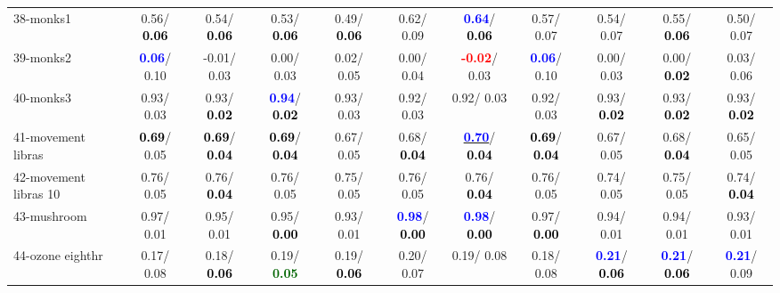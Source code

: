 \begin{table}[h]
\begin{center}
{\begin{tabular}{lc|c|c|c|c|c|c|c|c|c}
38-monks1 &   0.56/\textcolor{black}{\textbf{  0.06}} &   0.54/\textcolor{black}{\textbf{  0.06}} &   0.53/\textcolor{black}{\textbf{  0.06}} &   0.49/\textcolor{black}{\textbf{  0.06}} &   0.62/  0.09 & \textcolor{blue}{\textbf{  0.64}}/\textcolor{black}{\textbf{  0.06}} &   0.57/  0.07 &   0.54/  0.07 &   0.55/\textcolor{black}{\textbf{  0.06}} &   0.50/  0.07 \\
39-monks2 & \textcolor{blue}{\textbf{  0.06}}/  0.10 &  -0.01/  0.03 &   0.00/  0.03 &   0.02/  0.05 &   0.00/  0.04 & \textcolor{red}{\textbf{ -0.02}}/  0.03 & \textcolor{blue}{\textbf{  0.06}}/  0.10 &   0.00/  0.03 &   0.00/\textcolor{black}{\textbf{  0.02}} &   0.03/  0.06 \\ \hline
40-monks3 &   0.93/  0.03 &   0.93/\textcolor{black}{\textbf{  0.02}} & \textcolor{blue}{\textbf{  0.94}}/\textcolor{black}{\textbf{  0.02}} &   0.93/  0.03 &   0.92/  0.03 &   0.92/  0.03 &   0.92/  0.03 &   0.93/\textcolor{black}{\textbf{  0.02}} &   0.93/\textcolor{black}{\textbf{  0.02}} &   0.93/\textcolor{black}{\textbf{  0.02}} \\
41-movement libras & \textcolor{black}{\textbf{  0.69}}/  0.05 & \textcolor{black}{\textbf{  0.69}}/\textcolor{black}{\textbf{  0.04}} & \textcolor{black}{\textbf{  0.69}}/\textcolor{black}{\textbf{  0.04}} &   0.67/  0.05 &   0.68/\textcolor{black}{\textbf{  0.04}} & \underline{\textcolor{blue}{\textbf{  0.70}}}/\textcolor{black}{\textbf{  0.04}} & \textcolor{black}{\textbf{  0.69}}/\textcolor{black}{\textbf{  0.04}} &   0.67/  0.05 &   0.68/\textcolor{black}{\textbf{  0.04}} &   0.65/  0.05 \\
42-movement libras 10 &   0.76/  0.05 &   0.76/\textcolor{black}{\textbf{  0.04}} &   0.76/  0.05 &   0.75/  0.05 &   0.76/  0.05 &   0.76/\textcolor{black}{\textbf{  0.04}} &   0.76/  0.05 &   0.74/  0.05 &   0.75/  0.05 &   0.74/\textcolor{black}{\textbf{  0.04}} \\
43-mushroom &   0.97/  0.01 &   0.95/  0.01 &   0.95/\textcolor{black}{\textbf{  0.00}} &   0.93/  0.01 & \textcolor{blue}{\textbf{  0.98}}/\textcolor{black}{\textbf{  0.00}} & \textcolor{blue}{\textbf{  0.98}}/\textcolor{black}{\textbf{  0.00}} &   0.97/\textcolor{black}{\textbf{  0.00}} &   0.94/  0.01 &   0.94/  0.01 &   0.93/  0.01 \\
44-ozone eighthr &   0.17/  0.08 &   0.18/\textcolor{black}{\textbf{  0.06}} &   0.19/\textcolor{darkgreen}{\textbf{  0.05}} &   0.19/\textcolor{black}{\textbf{  0.06}} &   0.20/  0.07 &   0.19/  0.08 &   0.18/  0.08 & \textcolor{blue}{\textbf{  0.21}}/\textcolor{black}{\textbf{  0.06}} & \textcolor{blue}{\textbf{  0.21}}/\textcolor{black}{\textbf{  0.06}} & \textcolor{blue}{\textbf{  0.21}}/  0.09 \\

\end{tabular}}
\end{center}
\end{table}
